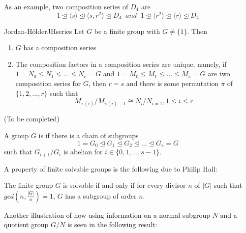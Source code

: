 \documentclass[12pt, a4paper, twoside, openright, titlepage]{book}
\begin{document}
As an example, two composition series of $D_4$ are \begin{equation*}
    1\trianglelefteq \langle s \rangle \trianglelefteq \langle s,r^2\rangle \trianglelefteq D_4\;\;and\;\;1 \trianglelefteq \langle r^2\rangle \trianglelefteq \langle r \rangle \trianglelefteq D_4
\end{equation*}


\begin{namthm}{Jordan-H\"{o}lder}{JHseries}
    Let $G$ be a finite group with $G \neq \{1\}$. Then \begin{enumerate}
        \item $G$ has a composition series
        \item The composition factors in a composition series are unique, namely, if $1 = N_0 \leq N_1 \leq ... \leq N_r = G$ and $1 = M_0 \leq M_1 \leq ... \leq M_s = G$ are two composition series for $G$, then $r = s$ and there is some permutation $\pi$ of $\{1,2,...,r\}$ such that \begin{equation*}
                M_{\pi(i)}/M_{\pi(i)-1}\cong N_i/N_{i=1}, 1 \leq i \leq r
        \end{equation*}
    \end{enumerate}
\end{namthm}
\begin{proof*}{}{}
    (To be completed)
\end{proof*}


\begin{defn}{}{}
    A group $G$ is  if there is a chain of subgroups \begin{equation*}
        1 = G_0 \trianglelefteq G_1 \trianglelefteq G_2 \trianglelefteq ... \trianglelefteq G_s = G
    \end{equation*}
    such that $G_{i+1}/G_i$ is abelian for $i \in \{0,1,...,s-1\}$.
\end{defn}

A property of finite solvable groups is the following due to Philip Hall: 

\begin{thm}{}{}
    The finite group $G$ is solvable if and only if for every divisor $n$ of $|G|$ such that $gcd\left(n,\frac{|G|}{n}\right) = 1$, $G$ has a subgroup of order $n$.
\end{thm}

Another illustration of how using information on a normal subgroup $N$ and a quotient group $G/N$ is seen in the following result:
\end{document}
